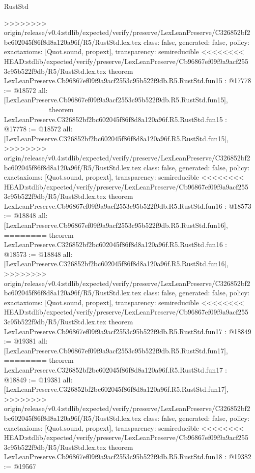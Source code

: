 \begin{lexlean}{RustStd}
\begin{coremodule}
{\begin{coremodule}
{{{{{{{{{{{{{{{{{{>>>>>>>> origin/release/v0.4:stdlib/expected/verify/preserve/LexLeanPreserve/C326852bf2bc602045f86f8d8a120a96f/R5/RustStd.lex.tex
  class: false,
  generated: false,
  policy: exact{axioms: [Quot.sound, propext]},
  transparency: semireducible
}
<<<<<<<< HEAD:stdlib/expected/verify/preserve/LexLeanPreserve/Cb96867ef09f9a9acf2553c95b522f9db/R5/RustStd.lex.tex
theorem LexLeanPreserve.Cb96867ef09f9a9acf2553c95b522f9db.R5.RustStd.fun15 : @17778 := @18572 {
  all: [LexLeanPreserve.Cb96867ef09f9a9acf2553c95b522f9db.R5.RustStd.fun15],
========
theorem LexLeanPreserve.C326852bf2bc602045f86f8d8a120a96f.R5.RustStd.fun15 : @17778 := @18572 {
  all: [LexLeanPreserve.C326852bf2bc602045f86f8d8a120a96f.R5.RustStd.fun15],
>>>>>>>> origin/release/v0.4:stdlib/expected/verify/preserve/LexLeanPreserve/C326852bf2bc602045f86f8d8a120a96f/R5/RustStd.lex.tex
  class: false,
  generated: false,
  policy: exact{axioms: [Quot.sound, propext]},
  transparency: semireducible
}
<<<<<<<< HEAD:stdlib/expected/verify/preserve/LexLeanPreserve/Cb96867ef09f9a9acf2553c95b522f9db/R5/RustStd.lex.tex
theorem LexLeanPreserve.Cb96867ef09f9a9acf2553c95b522f9db.R5.RustStd.fun16 : @18573 := @18848 {
  all: [LexLeanPreserve.Cb96867ef09f9a9acf2553c95b522f9db.R5.RustStd.fun16],
========
theorem LexLeanPreserve.C326852bf2bc602045f86f8d8a120a96f.R5.RustStd.fun16 : @18573 := @18848 {
  all: [LexLeanPreserve.C326852bf2bc602045f86f8d8a120a96f.R5.RustStd.fun16],
>>>>>>>> origin/release/v0.4:stdlib/expected/verify/preserve/LexLeanPreserve/C326852bf2bc602045f86f8d8a120a96f/R5/RustStd.lex.tex
  class: false,
  generated: false,
  policy: exact{axioms: [Quot.sound, propext]},
  transparency: semireducible
}
<<<<<<<< HEAD:stdlib/expected/verify/preserve/LexLeanPreserve/Cb96867ef09f9a9acf2553c95b522f9db/R5/RustStd.lex.tex
theorem LexLeanPreserve.Cb96867ef09f9a9acf2553c95b522f9db.R5.RustStd.fun17 : @18849 := @19381 {
  all: [LexLeanPreserve.Cb96867ef09f9a9acf2553c95b522f9db.R5.RustStd.fun17],
========
theorem LexLeanPreserve.C326852bf2bc602045f86f8d8a120a96f.R5.RustStd.fun17 : @18849 := @19381 {
  all: [LexLeanPreserve.C326852bf2bc602045f86f8d8a120a96f.R5.RustStd.fun17],
>>>>>>>> origin/release/v0.4:stdlib/expected/verify/preserve/LexLeanPreserve/C326852bf2bc602045f86f8d8a120a96f/R5/RustStd.lex.tex
  class: false,
  generated: false,
  policy: exact{axioms: [Quot.sound, propext]},
  transparency: semireducible
}
<<<<<<<< HEAD:stdlib/expected/verify/preserve/LexLeanPreserve/Cb96867ef09f9a9acf2553c95b522f9db/R5/RustStd.lex.tex
theorem LexLeanPreserve.Cb96867ef09f9a9acf2553c95b522f9db.R5.RustStd.fun18 : @19382 := @19567 {
}}}}}}}}}}}}}}}}}}}}}
\end{coremodule}}
\end{coremodule}
\end{lexlean}
